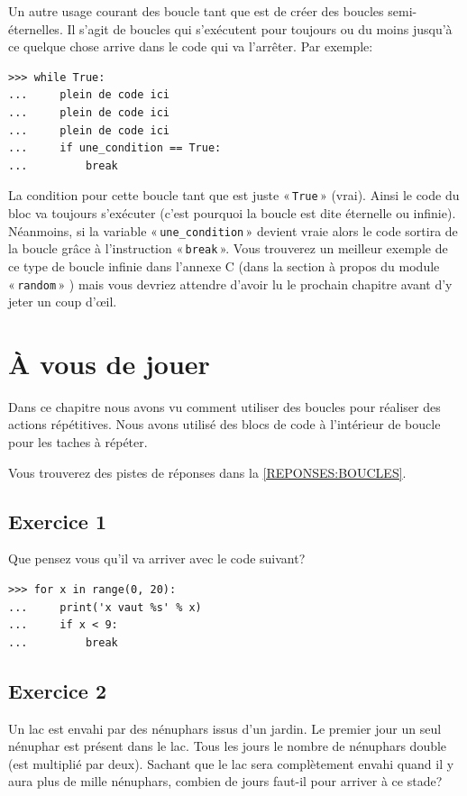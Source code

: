 Un autre usage courant des boucle tant que est de créer des boucles semi-éternelles. 
Il s'agit de boucles qui s'exécutent pour toujours ou du moins jusqu'à ce quelque chose arrive dans le code qui va l'arrêter. Par exemple:

\begin{Verbatim}[frame=single,rulecolor=\color{gray}, label=ne pas saisir]
>>> while True:
...     plein de code ici
...     plein de code ici
...     plein de code ici
...     if une_condition == True:
...         break
\end{Verbatim}

La condition pour cette boucle tant que est juste « \texttt{True} » (vrai). Ainsi le code du bloc va toujours s'exécuter (c'est pourquoi la boucle est dite éternelle ou infinie). Néanmoins, si la variable « \texttt{une\_condition} »   devient vraie alors le code sortira de la boucle grâce à l'instruction « \texttt{break} ». Vous trouverez un meilleur exemple de ce type de boucle infinie dans l'annexe C (dans la section à propos du module « \texttt{random} »  ) mais vous devriez attendre d'avoir lu le prochain chapitre avant d'y jeter un coup d'œil.

\section{À vous de jouer\label{PRATIQUE:BOUCLES}}
Dans ce chapitre nous avons vu comment utiliser des boucles pour réaliser des actions répétitives. Nous avons utilisé des blocs de code à l'intérieur de boucle pour les taches à répéter.


Vous trouverez des pistes de réponses dans la \autoref{REPONSES:BOUCLES}.
\subsection{Exercice 1}
Que pensez vous qu'il va arriver avec le code suivant?
\begin{Verbatim}[frame=single,rulecolor=\color{mbleu}, label=à taper]
>>> for x in range(0, 20):
... 	print('x vaut %s' % x)
... 	if x < 9:
... 		break
\end{Verbatim}

\subsection{Exercice 2}
Un lac est envahi par des nénuphars issus d'un jardin. Le premier jour un seul nénuphar est présent dans le lac.
Tous les jours le nombre de nénuphars double (est multiplié par deux). 
Sachant que le lac sera complètement envahi quand il y aura plus de mille nénuphars, combien de jours faut-il pour arriver à ce stade?

